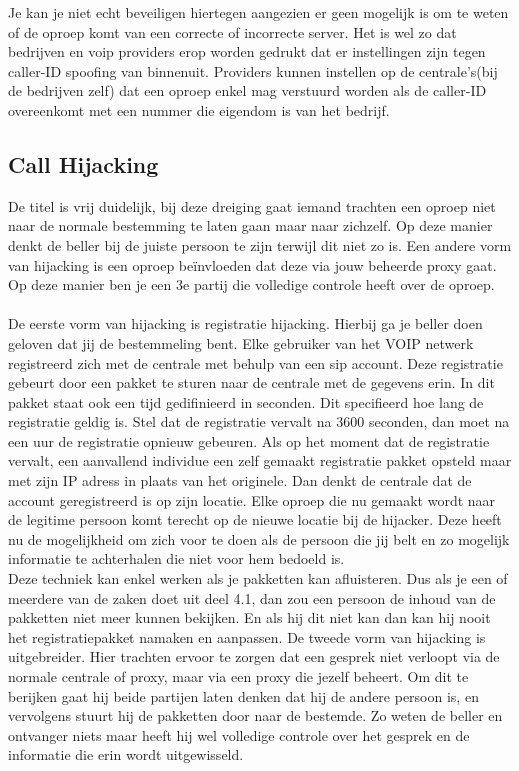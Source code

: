 \documentclass[pdftex,a4paper,12pt,twoside]{report}
\begin{document}
\newpage
Je kan je niet echt beveiligen hiertegen aangezien er geen mogelijk is om te weten of de oproep komt van een correcte of incorrecte server. Het is wel zo dat bedrijven en voip providers erop worden gedrukt dat er instellingen zijn tegen caller-ID spoofing van binnenuit. Providers kunnen instellen op de centrale's(bij de bedrijven zelf) dat een oproep enkel mag verstuurd worden als de caller-ID overeenkomt met een nummer die eigendom is van het bedrijf.

\subsection{Call Hijacking}
De titel is vrij duidelijk, bij deze dreiging gaat iemand trachten een oproep niet naar de normale bestemming te laten gaan maar naar zichzelf. Op deze manier denkt de beller bij de juiste persoon te zijn terwijl dit niet zo is. Een andere vorm van hijacking is een oproep beïnvloeden dat deze via jouw beheerde proxy gaat. Op deze manier ben je een 3e partij die volledige controle heeft over de oproep. 
\\ \\
De eerste vorm van hijacking is registratie hijacking. Hierbij ga je beller doen geloven dat jij de bestemmeling bent. Elke gebruiker van het VOIP netwerk registreerd zich met de centrale met behulp van een sip account. Deze registratie gebeurt door een pakket te sturen naar de centrale met de gegevens erin. In dit pakket staat ook een tijd gedifinieerd in seconden. Dit specifieerd hoe lang de registratie geldig is. Stel dat de registratie vervalt na 3600 seconden, dan moet na een uur de registratie opnieuw gebeuren. Als op het moment dat de registratie vervalt, een aanvallend individue een zelf gemaakt registratie pakket opsteld maar met zijn IP adress in plaats van het originele. Dan denkt de centrale dat de account geregistreerd is op zijn locatie. Elke oproep die nu gemaakt wordt naar de legitime persoon komt terecht op de nieuwe locatie bij de hijacker. Deze heeft nu de mogelijkheid om zich voor te doen als de persoon die jij belt en zo mogelijk informatie te achterhalen die niet voor hem bedoeld is.\\
Deze techniek kan enkel werken als je pakketten kan afluisteren. Dus als je een of meerdere van de zaken doet uit deel 4.1, dan zou een persoon de inhoud van de pakketten niet meer kunnen bekijken. En als hij dit niet kan dan kan hij nooit het registratiepakket namaken en aanpassen.
\newpage
De tweede vorm van hijacking is uitgebreider. Hier trachten ervoor te zorgen dat een gesprek niet verloopt via de normale centrale of proxy, maar via een proxy die jezelf beheert. Om dit te berijken gaat hij beide partijen laten denken dat hij de andere persoon is, en vervolgens stuurt hij de pakketten door naar de bestemde. Zo weten de beller en ontvanger niets maar heeft hij wel volledige controle over het gesprek en de informatie die erin wordt uitgewisseld.\\
\end{document}
